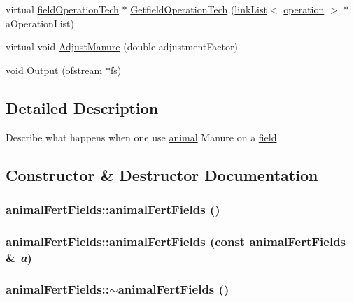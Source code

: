 \begin{DoxyCompactItemize}
\item 
virtual \hyperlink{classfield_operation_tech}{fieldOperationTech} $\ast$ \hyperlink{classanimal_fert_fields_a92bb741105761340a580dba156326c93}{GetfieldOperationTech} (\hyperlink{classlink_list}{linkList}$<$ \hyperlink{classoperation}{operation} $>$ $\ast$aOperationList)
\item 
virtual void \hyperlink{classanimal_fert_fields_acd88dcd5d81b63d622a6ff1d30bd72ff}{AdjustManure} (double adjustmentFactor)
\item 
void \hyperlink{classanimal_fert_fields_a486ecb469147fbfd89dc4461c202ca36}{Output} (ofstream $\ast$fs)
\end{DoxyCompactItemize}


\subsection{Detailed Description}
Describe what happens when one use \hyperlink{classanimal}{animal} Manure on a \hyperlink{classfield}{field} 

\subsection{Constructor \& Destructor Documentation}
\hypertarget{classanimal_fert_fields_aaa7642ddd0eaf9c7cb73bb950daf1d9c}{
\subsubsection[{animalFertFields}]{\setlength{\rightskip}{0pt plus 5cm}animalFertFields::animalFertFields ()}}
\label{classanimal_fert_fields_aaa7642ddd0eaf9c7cb73bb950daf1d9c}
\hypertarget{classanimal_fert_fields_ab09ac431c3b6c3f7d63d646b65f88d59}{
\subsubsection[{animalFertFields}]{\setlength{\rightskip}{0pt plus 5cm}animalFertFields::animalFertFields (const {\bf animalFertFields} \& {\em a})}}
\label{classanimal_fert_fields_ab09ac431c3b6c3f7d63d646b65f88d59}
\hypertarget{classanimal_fert_fields_a74d1573043fe70ee33287f010c156ab1}{
\subsubsection[{$\sim$animalFertFields}]{\setlength{\rightskip}{0pt plus 5cm}animalFertFields::$\sim$animalFertFields ()}}
\label{classanimal_fert_fields_a74d1573043fe70ee33287f010c156ab1}


